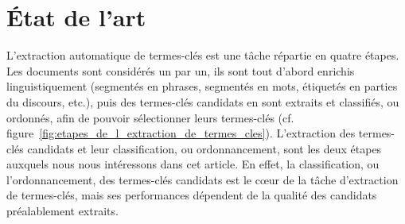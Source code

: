 \section{État de l'art}
\label{sec:etat_de_l_art}
  L'extraction automatique de termes-clés est une tâche répartie en quatre
  étapes. Les documents sont considérés un par un, ils sont tout d'abord
  enrichis linguistiquement (segmentés en phrases, segmentés en mots, étiquetés
  en parties du discours, etc.), puis des termes-clés candidats en sont extraits
  et classifiés, ou ordonnés, afin de pouvoir sélectionner leurs termes-clés
  (cf. figure~\ref{fig:etapes_de_l_extraction_de_termes_cles}). L'extraction des
  termes-clés candidats et leur classification, ou ordonnancement, sont les deux
  étapes auxquels nous nous intéressons dans cet article. En effet, la
  classification, ou l'ordonnancement, des termes-clés candidats est le c\oe{}ur
  de la tâche d'extraction de termes-clés, mais ses performances dépendent de la
  qualité des candidats préalablement extraits.
